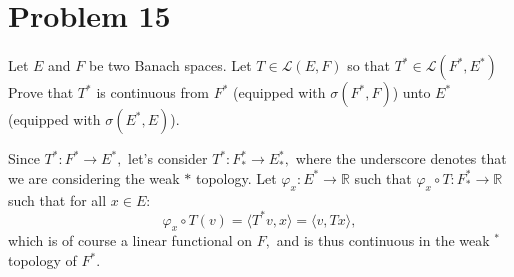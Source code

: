 \documentclass[11pt]{article}
\newcommand{\bbR}{\mathbb{R}}
\begin{document}
\section*{Problem 15}
\begin{problem}
    Let $E$ and $F$ be two Banach spaces. Let $T\in \mathcal{L}(E,F)$ so that $T^* \in \mathcal{L}(F^*, E^*)$ Prove that $T^*$ is continuous from $F^*$ (equipped with $\sigma(F^*, F)$) unto $E^*$ (equipped with $\sigma(E^*, E)$).
\end{problem}
\begin{solution}
    Since $T^*: F^* \to E^*,$ let's consider $T^*: F^*_* \to E^*_*,$ where the underscore denotes that we are considering the weak $*$ topology. Let $\varphi_x: E^* \to \bbR$ such that $\varphi_x \circ T: F^*_* \to \bbR$ such that for all $x\in E:$ 
    \[\varphi_x\circ T(v) = \langle T^*v, x\rangle = \langle v, Tx\rangle,\] which is of course a linear functional on $F,$ and is thus continuous in the weak $^*$ topology of $F^*.$
\end{solution}

\newpage
\end{document}
